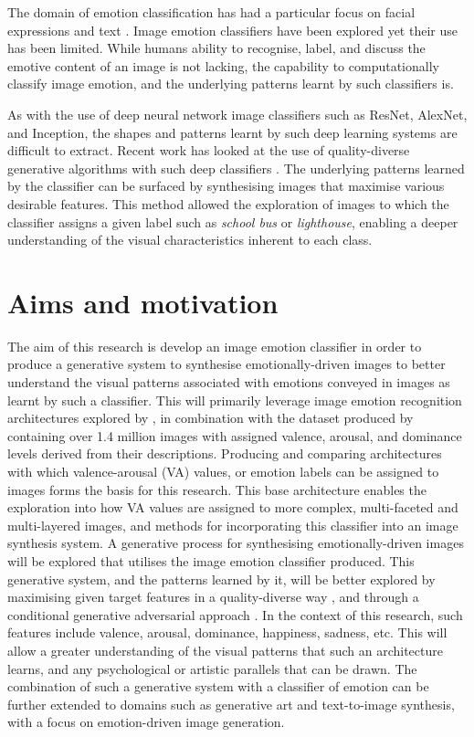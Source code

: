 \documentclass{article}
\begin{document}
The domain of emotion classification has had a particular focus on facial expressions and text \citep{cambria2016affective, warriner2013norms}.
Image emotion classifiers have been explored \citep{kim2018building, machajdik2010affective, chen2015learning, chen2014deepsentibank} yet their use has been limited.
While humans ability to recognise, label, and discuss the emotive content of an image is not lacking, the capability to computationally classify image emotion, and the underlying patterns learnt by such classifiers is.

As with the use of deep neural network image classifiers such as ResNet, AlexNet, and Inception, the shapes and patterns learnt by such deep learning systems are difficult to extract.
Recent work has looked at the use of quality-diverse generative algorithms with such deep classifiers \citep{nguyen2015deep, nguyen2015innovation}.
The underlying patterns learned by the classifier can be surfaced by synthesising images that maximise various desirable features.
This method allowed the exploration of images to which the classifier assigns a given label such as \textit{school bus} or \textit{lighthouse}, enabling a deeper understanding of the visual characteristics inherent to each class.

\section{Aims and motivation}
The aim of this research is develop an image emotion classifier in order to produce a generative system to synthesise emotionally-driven images to better understand the visual patterns associated with emotions conveyed in images as learnt by such a classifier.
This will primarily leverage image emotion recognition architectures explored by \citet{kim2018building}, in combination with the dataset produced by \citet{zhao2016predicting} containing over 1.4 million images with assigned valence, arousal, and dominance levels derived from their descriptions.
Producing and comparing architectures with which valence-arousal (VA) values, or emotion labels can be assigned to images forms the basis for this research.
This base architecture enables the exploration into how VA values are assigned to more complex, multi-faceted and multi-layered images, and methods for incorporating this classifier into an image synthesis system.
A generative process for synthesising emotionally-driven images will be explored that utilises the image emotion classifier produced.
This generative system, and the patterns learned by it, will be better explored by maximising given target features in a quality-diverse way \citep{nguyen2015innovation, nguyen2015deep}, and through a conditional generative adversarial approach \citep{tan2017artgan, gan2017stylenet}.
In the context of this research, such features include valence, arousal, dominance, happiness, sadness, etc.
This will allow a greater understanding of the visual patterns that such an architecture learns, and any psychological or artistic parallels that can be drawn.
The combination of such a generative system with a classifier of emotion can be further extended to domains such as generative art and text-to-image synthesis, with a focus on emotion-driven image generation.
\end{document}
